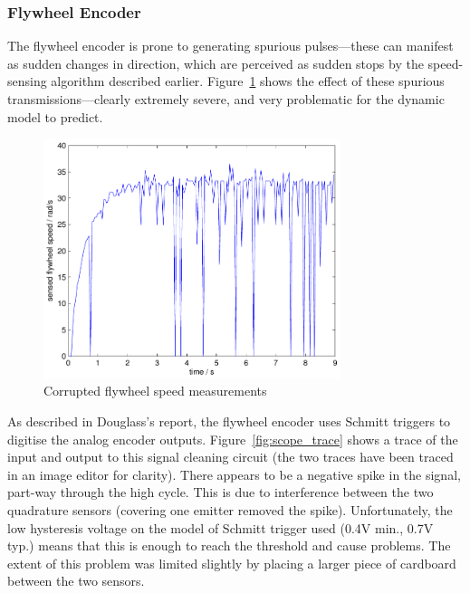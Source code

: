 \documentclass{IIBproject}
\begin{document}
\subsubsection{Flywheel Encoder}

The flywheel encoder is prone to generating spurious pulses---these can
manifest as sudden changes in direction, which are perceived as sudden stops
by the speed-sensing algorithm described earlier.
Figure~\ref{fig:bad_fly_speed} shows the effect of these spurious
transmissions---clearly extremely severe, and very problematic for the dynamic
model to predict.

\begin{figure}[htpb]
  \begin{center}
    \includegraphics[height=7cm]{bad_fly_speed.pdf}
    \end{center}
    \caption{Corrupted flywheel speed measurements}
    \label{fig:bad_fly_speed}
    \end{figure}

As described in Douglass's report, the flywheel encoder uses Schmitt triggers
to digitise the analog encoder outputs. Figure~\ref{fig:scope_trace} shows a
trace of the input and output to this signal cleaning circuit (the two traces
have been traced in an image editor for clarity). There appears to be a
negative spike in the signal, part-way through the high cycle.  This is due to
interference between the two quadrature sensors (covering one emitter removed
the spike). Unfortunately, the low hysteresis voltage on the model of Schmitt
trigger used (0.4V min., 0.7V typ.) means that this is enough to reach the
threshold and cause problems. The extent of this problem was limited slightly
by placing a larger piece of cardboard between the two sensors.
\end{document}
